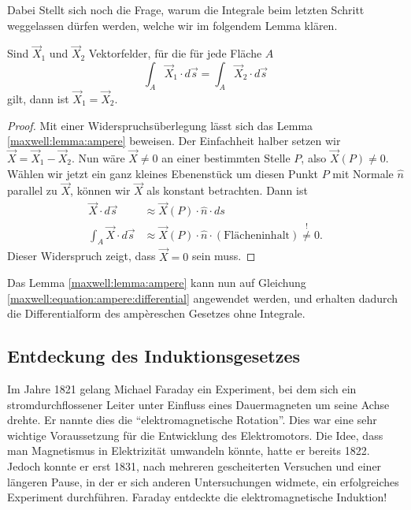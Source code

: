Dabei Stellt sich noch die Frage, warum die Integrale beim letzten Schritt weggelassen dürfen werden, welche wir im folgendem Lemma klären.
\begin{lemma}
	\label{maxwell:lemma:ampere}
	Sind $\vec{X}_1$ und $\vec{X}_2$ Vektorfelder, für die für jede Fläche $A$
	\[
	\int_A \vec{X}_1\cdot d\vec{s}
	=
	\int_A \vec{X}_2\cdot d\vec{s}
	\]
	gilt, dann ist $\vec{X}_1=\vec{X}_2$.
\end{lemma}

\begin{proof}
	\label{maxwell:proof:ampere}
	Mit einer Widerspruchsüberlegung lässt sich das Lemma \ref{maxwell:lemma:ampere} beweisen.
	Der Einfachheit halber setzen wir $\vec{X} = \vec{X}_1-\vec{X}_2$.
	Nun wäre $\vec{X} \ne 0$ an einer bestimmten Stelle $P$, also $\vec{X}(P) \ne 0$.
	Wählen wir jetzt ein ganz kleines Ebenenstück um diesen Punkt $P$ mit Normale $\hat{n}$ parallel zu $\vec{X}$, können wir $\vec{X}$ als konstant betrachten. 
	Dann ist
	\begin{align*}
		\vec{X} \cdot d\vec{s} 
		&\approx
		\vec{X}(P) \cdot \hat{n} \cdot ds
		\\
		\int_{A} \vec{X} \cdot d\vec{s}
		&\approx
		\vec{X}(P) \cdot \hat{n} \cdot (\text{Flächeninhalt}) \overset{!}{\ne} 0.
	\end{align*}
	Dieser Widerspruch zeigt, dass $\vec{X} = 0$ sein muss.
\end{proof}
Das Lemma \ref{maxwell:lemma:ampere} kann nun auf Gleichung \eqref{maxwell:equation:ampere:differential} angewendet werden, und erhalten dadurch die Differentialform des ampèreschen Gesetzes ohne Integrale.


\subsection{Entdeckung des Induktionsgesetzes}

Im Jahre 1821 gelang Michael Faraday ein Experiment, bei dem sich ein stromdurchflossener Leiter unter Einfluss eines Dauermagneten um seine Achse drehte.
Er nannte dies die ``elektromagnetische Rotation''.
Dies war eine sehr wichtige Voraussetzung für die Entwicklung des Elektromotors. 
Die Idee, dass man Magnetismus in Elektrizität umwandeln könnte, hatte er bereits 1822.
Jedoch konnte er erst 1831, nach mehreren gescheiterten Versuchen und einer längeren Pause, in der er sich anderen Untersuchungen widmete, ein erfolgreiches Experiment durchführen.
Faraday entdeckte die elektromagnetische Induktion!

